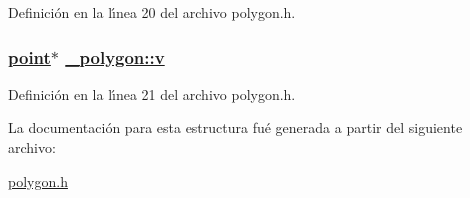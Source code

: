 Definici\'{o}n en la l\'{\i}nea 20 del archivo polygon.h.\hypertarget{struct__polygon_32ccf29956c65625eddb9f4c75ce0f0c_32ccf29956c65625eddb9f4c75ce0f0c}{
\subsubsection[v]{\setlength{\rightskip}{0pt plus 5cm}\hyperlink{struct__point}{point}$\ast$ \hyperlink{struct__polygon_32ccf29956c65625eddb9f4c75ce0f0c_32ccf29956c65625eddb9f4c75ce0f0c}{\_\-polygon::v}}}
\label{struct__polygon_32ccf29956c65625eddb9f4c75ce0f0c_32ccf29956c65625eddb9f4c75ce0f0c}




Definici\'{o}n en la l\'{\i}nea 21 del archivo polygon.h.

La documentaci\'{o}n para esta estructura fu\'{e} generada a partir del siguiente archivo:\begin{CompactItemize}
\item 
\hyperlink{polygon_8h}{polygon.h}\end{CompactItemize}
